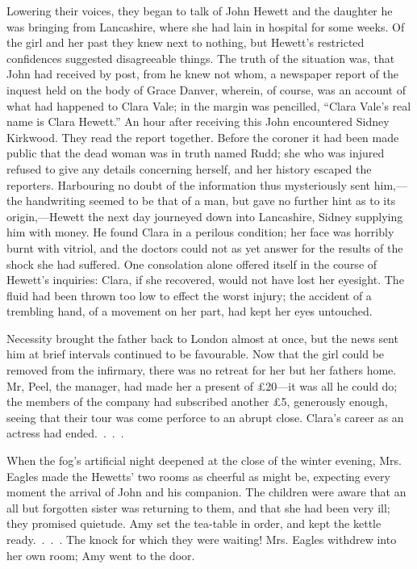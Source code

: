 Lowering their voices, they began to talk of John Hewett and the
daughter he was bringing from Lancashire, where she had lain in hospital
for some weeks. Of the girl and her past they knew next to nothing, but
Hewett's restricted confidences suggested disagreeable things. The truth
of the situation was, that John had received by post, from he knew not
whom, a newspaper report of the inquest held on the body of Grace
Danver, wherein, of course, was an account of what
{\protect\hypertarget{295}{}{}}had happened to Clara Vale; in the margin
was pencilled, ``Clara Vale's real name is Clara Hewett.'' An hour after
receiving this John encountered Sidney Kirkwood. They read the report
together. Before the coroner it had been made public that the dead woman
was in truth named Rudd; she who was injured refused to give any details
concerning herself, and her history escaped the reporters. Harbouring no
doubt of the information thus mysteriously sent him,---the handwriting
seemed to be that of a man, but gave no further hint as to its
origin,---Hewett the next day journeyed down into Lancashire, Sidney
supplying him with money. He found Clara in a perilous condition; her
face was horribly burnt with vitriol, and the doctors could not as yet
answer for the results of the shock she had suffered. One consolation
alone offered itself in the course of Hewett's inquiries: Clara, if she
recovered, would not have lost her eyesight. The fluid had been thrown
too low to effect the worst injury; the accident of a trembling hand, of
a movement on her part, had kept her eyes untouched.

{\protect\hypertarget{296}{}{}}Necessity brought the father back to
London almost at once, but the news sent him at brief intervals
continued to be favourable. Now that the girl could be removed from the
infirmary, there was no retreat for her but her fathers home. Mr, Peel,
the manager, had made her a present of £20---it was all he could do; the
members of the company had subscribed another £5, generously enough,
seeing that their tour was come perforce to an abrupt close. Clara's
career as an actress had ended{.~.~.~.}

When the fog's artificial night deepened at the close of the winter
evening, Mrs. Eagles made the Hewetts' two rooms as cheerful as might
be, expecting every moment the arrival of John and his companion. The
children were aware that an all but forgotten sister was returning to
them, and that she had been very ill; they promised quietude. Amy set
the tea-table in order, and kept the kettle ready{.~.~.~.} The knock for
which they were waiting! Mrs. Eagles withdrew into her own room; Amy
went to the door.

